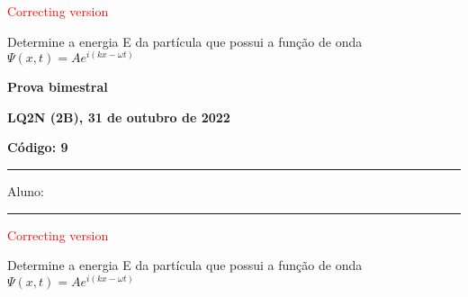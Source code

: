 \documentclass[12pt, addpoints]{exam}
\begin{document}
        \begin{center}
\textcolor{red}{\emph\Large Correcting version}\end{center}
\begin{questions}
\begin{multicols*}{2}
\question[20] Determine a energia E da partícula que possui a função de onda $\Psi(x,t)=Ae^{i(kx-\omega t)}$

\begin{oneparchoices}
\end{oneparchoices}
\end{multicols*}
\end{questions}
\newpage
        \begin{minipage}[b]{0.75\linewidth}
            \begin{flushleft}
                {\bf \large Prova bimestral}
            \end{flushleft}
            \begin{flushleft}
                {\bf \large LQ2N (2B), 31 de outubro de 2022}
            \end{flushleft}
        \end{minipage}
        \begin{minipage}[b]{0.20\linewidth}
            \begin{flushright}
                {\bf \large Código: 9}
            \end{flushright}
        \end{minipage}
        \vspace{0.5cm} \hrule \vspace{0.5cm}
        \begin{minipage}{0.75\linewidth}
            Aluno:
        \end{minipage}
        \vspace{0.5cm} \hrule \vspace{0.5cm}

        \begin{center}
\textcolor{red}{\emph\Large Correcting version}\end{center}
\begin{questions}
\begin{multicols*}{2}
\question[20] Determine a energia E da partícula que possui a função de onda $\Psi(x,t)=Ae^{i(kx-\omega t)}$

\begin{oneparchoices}
\end{oneparchoices}
\end{multicols*}
\end{questions}
\newpage
\end{document}
